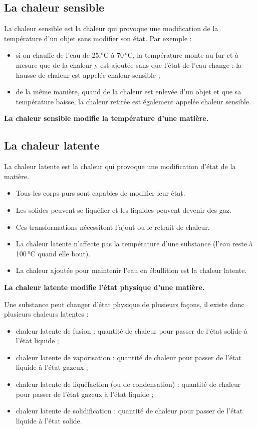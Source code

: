 \subsection*{La chaleur sensible}
La chaleur sensible est la chaleur qui provoque une modification de la température d'un objet sans modifier son état.
Par exemple :
\begin{itemize}
  \item si on chauffe de l'eau de 25,°C à 70\,°C, la température monte au fur et à mesure que de la chaleur y est ajoutée sans que l'état de l'eau change : la hausse de chaleur est appelée chaleur sensible ;
  \item de la même manière, quand de la chaleur est enlevée d'un objet et que sa température baisse, la chaleur retirée est également appelée chaleur sensible.
\end{itemize}
\textbf{La chaleur sensible modifie la température d'une matière.}

\subsection*{La chaleur latente}
La chaleur latente est la chaleur qui provoque une modification d'état de la matière.
\begin{itemize}
  \item Tous les corps purs sont capables de modifier leur état.
  \item Les solides peuvent se liquéfier et les liquides peuvent devenir des gaz.
  \item Ces transformations nécessitent l'ajout ou le retrait de chaleur.
  \item La chaleur latente n'affecte pas la température d'une substance (l'eau reste à 100\,°C quand elle bout).
  \item La chaleur ajoutée pour maintenir l'eau en ébullition est la chaleur latente.
\end{itemize}
\textbf{La chaleur latente modifie l'état physique d'une matière.}


Une substance peut changer d'état physique de plusieurs façons, il existe donc plusieurs chaleurs latentes :
\begin{itemize}
  \item chaleur latente de fusion : quantité de chaleur pour passer de l'état solide à l'état liquide ;
  \item chaleur latente de vaporisation : quantité de chaleur pour passer de l'état liquide à l'état gazeux ;
  \item chaleur latente de liquéfaction (ou de condensation) : quantité de chaleur pour passer de l'état gazeux à l'état liquide ;
  \item chaleur latente de solidification : quantité de chaleur pour passer de l'état liquide à l'état solide.
\end{itemize}

